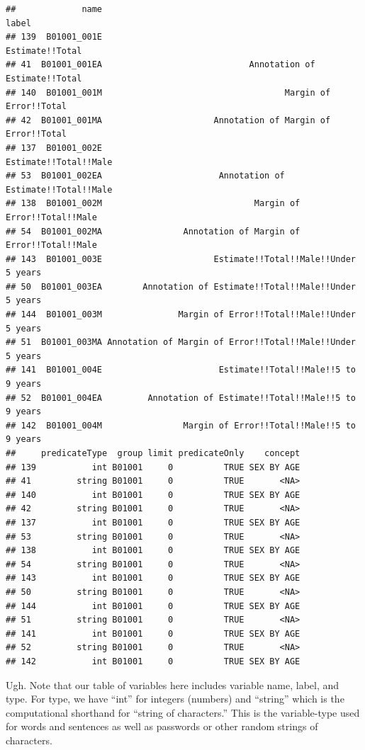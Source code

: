 \documentclass[openany]{book}
\begin{document}
\begin{verbatim}
##             name                                                     label
## 139  B01001_001E                                           Estimate!!Total
## 41  B01001_001EA                             Annotation of Estimate!!Total
## 140  B01001_001M                                    Margin of Error!!Total
## 42  B01001_001MA                      Annotation of Margin of Error!!Total
## 137  B01001_002E                                     Estimate!!Total!!Male
## 53  B01001_002EA                       Annotation of Estimate!!Total!!Male
## 138  B01001_002M                              Margin of Error!!Total!!Male
## 54  B01001_002MA                Annotation of Margin of Error!!Total!!Male
## 143  B01001_003E                      Estimate!!Total!!Male!!Under 5 years
## 50  B01001_003EA        Annotation of Estimate!!Total!!Male!!Under 5 years
## 144  B01001_003M               Margin of Error!!Total!!Male!!Under 5 years
## 51  B01001_003MA Annotation of Margin of Error!!Total!!Male!!Under 5 years
## 141  B01001_004E                       Estimate!!Total!!Male!!5 to 9 years
## 52  B01001_004EA         Annotation of Estimate!!Total!!Male!!5 to 9 years
## 142  B01001_004M                Margin of Error!!Total!!Male!!5 to 9 years
##     predicateType  group limit predicateOnly    concept
## 139           int B01001     0          TRUE SEX BY AGE
## 41         string B01001     0          TRUE       <NA>
## 140           int B01001     0          TRUE SEX BY AGE
## 42         string B01001     0          TRUE       <NA>
## 137           int B01001     0          TRUE SEX BY AGE
## 53         string B01001     0          TRUE       <NA>
## 138           int B01001     0          TRUE SEX BY AGE
## 54         string B01001     0          TRUE       <NA>
## 143           int B01001     0          TRUE SEX BY AGE
## 50         string B01001     0          TRUE       <NA>
## 144           int B01001     0          TRUE SEX BY AGE
## 51         string B01001     0          TRUE       <NA>
## 141           int B01001     0          TRUE SEX BY AGE
## 52         string B01001     0          TRUE       <NA>
## 142           int B01001     0          TRUE SEX BY AGE
\end{verbatim}

Ugh. Note that our table of variables here includes variable name, label, and type. For type, we have ``int'' for integers (numbers) and ``string'' which is the computational shorthand for ``string of characters.'' This is the variable-type used for words and sentences as well as passwords or other random strings of characters.
\end{document}
